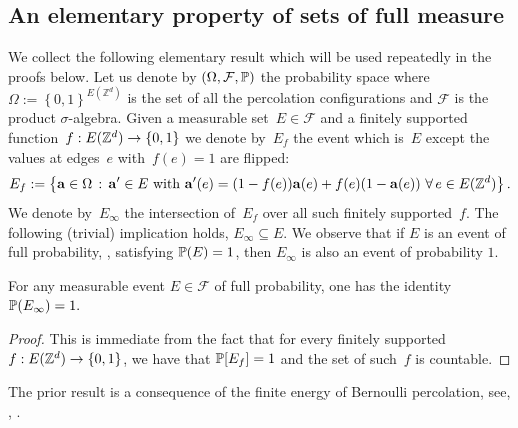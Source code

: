 \documentclass[12pt]{amsart}
\numberwithin{equation}{section}
\begin{document}
	
	\subsection{An elementary property of sets of full measure}
	
	We collect the following elementary result which will be used repeatedly in the proofs below. Let us denote by $\left( \Omega , \mathcal{F} , \P\right)$ the probability space where $\Omega := \left\{ 0, 1 \right\}^{E ( \mathbb{Z}^d )}$ is the set of all the percolation configurations and $\mathcal{F}$ is the product $\sigma$-algebra. Given a measurable set~$E \in \mathcal{F}$ and a finitely supported function~$f: E(\Zd) \to \{0, 1\}$ we denote by~$E_f$ the event which is~$E$ except the values at edges~$e$ with~$f(e)=1$
	are flipped:
	\[
	E_f := \left\{ \mathbf{a} \in \Omega \, : \, {\mathbf{a}}' \in E ~ \mbox{with} ~  {\mathbf{a}}'(e) = (1 - f(e)) \mathbf{a}(e) + f(e)(1 - \mathbf{a}(e)) \, \, \forall \, e \in E(\Zd) \right\}.
	\]
	We denote by~$E_{\infty}$ the intersection of~$E_f$ over all such finitely supported~$f$. 	The following (trivial) implication holds, $E_\infty \subseteq E$. We observe that if $E$ is an event of full probability,  \ie, satisfying $\P(E) = 1$, then $E_\infty$ is also an event of probability $1$.
	
	\begin{lemma} \label{lemma:finite-energy}
		For any measurable event $E \in \mathcal{F}$ of full probability, one has the identity
		$\P (E_\infty) = 1.$
	\end{lemma}
	
	\begin{proof}
		This is immediate from the fact that for every finitely supported~$f: E(\Zd)  \to \{0,1\}$, we have that $\P[E_f] = 1$ and the set of such~$f$ is countable. 
	\end{proof}
	
	\begin{remark}
		The prior result is a consequence of the finite energy of Bernoulli percolation, see, \eg, \cite[Section 7.2]{lyons-peres-book}.
	\end{remark}
	
	
\end{document}
